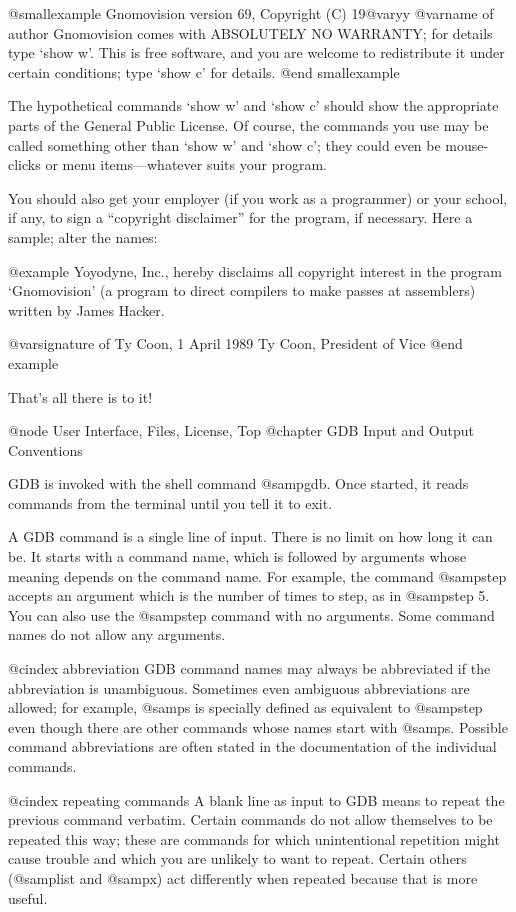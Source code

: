 @smallexample
Gnomovision version 69, Copyright (C) 19@var{yy} @var{name of author}
Gnomovision comes with ABSOLUTELY NO WARRANTY; for details type `show w'.
This is free software, and you are welcome to redistribute it
under certain conditions; type `show c' for details.
@end smallexample

The hypothetical commands `show w' and `show c' should show the
appropriate parts of the General Public License.  Of course, the
commands you use may be called something other than `show w' and `show
c'; they could even be mouse-clicks or menu items---whatever suits your
program.

You should also get your employer (if you work as a programmer) or your
school, if any, to sign a ``copyright disclaimer'' for the program, if
necessary.  Here a sample; alter the names:

@example
Yoyodyne, Inc., hereby disclaims all copyright interest in the
program `Gnomovision' (a program to direct compilers to make passes
at assemblers) written by James Hacker.

@var{signature of Ty Coon}, 1 April 1989
Ty Coon, President of Vice
@end example

That's all there is to it!

@node User Interface, Files, License, Top
@chapter GDB Input and Output Conventions

GDB is invoked with the shell command @samp{gdb}.  Once started, it reads
commands from the terminal until you tell it to exit.

A GDB command is a single line of input.  There is no limit on how long
it can be.  It starts with a command name, which is followed by arguments
whose meaning depends on the command name.  For example, the command
@samp{step} accepts an argument which is the number of times to step,
as in @samp{step 5}.  You can also use the @samp{step} command with
no arguments.  Some command names do not allow any arguments.

@cindex abbreviation
GDB command names may always be abbreviated if the abbreviation is
unambiguous.  Sometimes even ambiguous abbreviations are allowed; for
example, @samp{s} is specially defined as equivalent to @samp{step}
even though there are other commands whose names start with @samp{s}.
Possible command abbreviations are often stated in the documentation
of the individual commands.

@cindex repeating commands
A blank line as input to GDB means to repeat the previous command verbatim.
Certain commands do not allow themselves to be repeated this way; these are
commands for which unintentional repetition might cause trouble and which
you are unlikely to want to repeat.  Certain others (@samp{list} and
@samp{x}) act differently when repeated because that is more useful.

